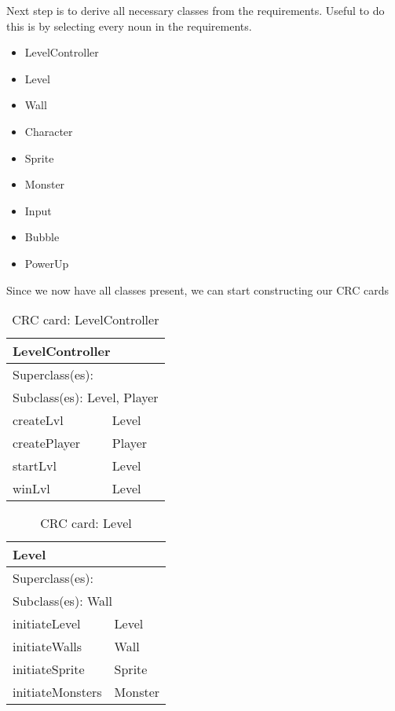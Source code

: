 \noindent Next step is to derive all necessary classes from the requirements. Useful to do this is by selecting every noun in the requirements. 
\begin{itemize}
    \item LevelController
    \item Level
    \item Wall
    \item Character
    \item Sprite
    \item Monster
    \item Input
    \item Bubble
    \item PowerUp
\end{itemize}

\noindent Since we now have all classes present, we can start constructing our CRC cards

\begin{table}[h!]
\centering
\label{crc_levelcontroller}
\begin{tabular}{|l|l|}
\hline
\multicolumn{2}{|l|}{\textbf{LevelController}} \\ \hline
\multicolumn{2}{|l|}{Superclass(es):} \\ \hline
\multicolumn{2}{|l|}{Subclass(es): Level, Player} \\ \hline
createLvl               & Level \\ \hline
createPlayer            & Player \\ \hline
startLvl                & Level \\ \hline
winLvl                  & Level \\ \hline
\end{tabular}
\caption{CRC card: LevelController}
\end{table}

\begin{table}[h!]
\centering
\label{crc_level}
\begin{tabular}{|l|l|}
\hline
\multicolumn{2}{|l|}{\textbf{Level}} \\ \hline
\multicolumn{2}{|l|}{Superclass(es):} \\ \hline
\multicolumn{2}{|l|}{Subclass(es): Wall} \\ \hline
initiateLevel           & Level \\ \hline
initiateWalls           & Wall \\ \hline
initiateSprite          & Sprite \\ \hline
initiateMonsters        & Monster \\ \hline
\end{tabular}
\caption{CRC card: Level}
\end{table}

